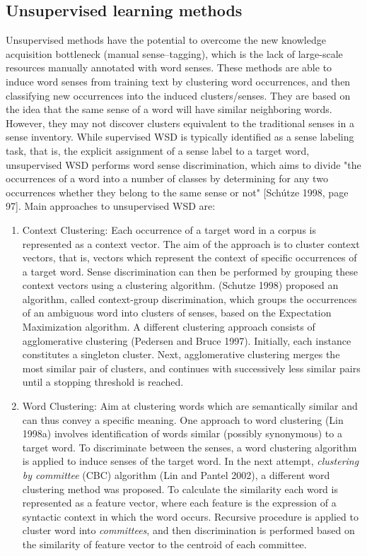 \subsection{Unsupervised learning methods}
Unsupervised methods have the potential to overcome the new knowledge acquisition bottleneck 
(manual sense--tagging), which is the lack of large-scale resources manually annotated
with word senses. These methods are able to induce word senses from training text by clustering word 
occurrences, and then classifying new occurrences into the induced clusters/senses. They are based on 
the idea that the same sense of a word will have similar neighboring words. However, they may not 
discover clusters equivalent to the traditional senses in a sense inventory.
While supervised WSD is typically identified as a sense labeling task, that is, the explicit assignment
of a sense label to a target word, unsupervised WSD performs word sense
discrimination, which aims to divide "the occurrences of a word into a number of
classes by determining for any two occurrences whether they belong to the same sense
or not" [Sch\'utze 1998, page 97]. Main approaches to unsupervised WSD are:
\begin{enumerate}
\item Context Clustering: Each occurrence of a target word in a corpus is represented as a context vector. 
The aim of the approach is to cluster context vectors, that is, vectors which represent the context
of specific occurrences of a target word. Sense discrimination can then be performed by grouping these context vectors using a clustering algorithm. (Schutze 1998) proposed an algorithm, called
context-group discrimination, which groups the occurrences of an ambiguous word into
clusters of senses, based on the Expectation Maximization algorithm. A different clustering approach
consists of agglomerative clustering (Pedersen and Bruce 1997). Initially, each instance
constitutes a singleton cluster. Next, agglomerative clustering merges the most similar
pair of clusters, and continues with successively less similar pairs until a stopping
threshold is reached.
\item Word Clustering: Aim at clustering words which are semantically similar and can thus convey a specific meaning. One approach to word clustering (Lin 1998a) involves identification
of words similar (possibly synonymous) to a target word. To discriminate between the senses, a word
clustering algorithm is applied to induce senses of the target word. In the next attempt, \textit{clustering 
by committee} (CBC) algorithm (Lin and Pantel 2002), a different word clustering method was proposed. 
To calculate the similarity each word is represented as a feature vector, where each feature is the 
expression of a syntactic context in which the word occurs. Recursive procedure is applied to cluster word into \textit{committees}, and then discrimination is performed based on the similarity of feature vector to 
the centroid of each committee.
\end{enumerate}

